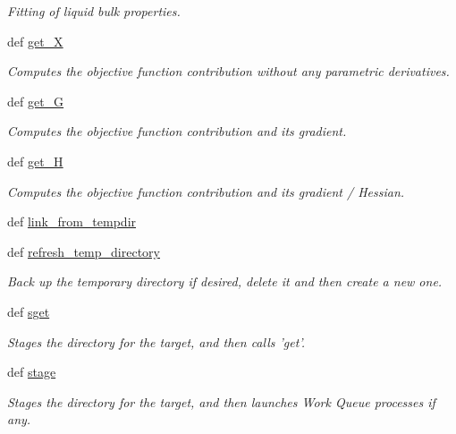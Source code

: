 \begin{DoxyCompactItemize}
\begin{DoxyCompactList}\small\item\em \-Fitting of liquid bulk properties. \end{DoxyCompactList}\item 
def \hyperlink{classforcebalance_1_1target_1_1Target_a606dd136f195c267c05a2455405e5949}{get\-\_\-\-X}
\begin{DoxyCompactList}\small\item\em \-Computes the objective function contribution without any parametric derivatives. \end{DoxyCompactList}\item 
def \hyperlink{classforcebalance_1_1target_1_1Target_afa8cc38c8bba8861c072e789717aa049}{get\-\_\-\-G}
\begin{DoxyCompactList}\small\item\em \-Computes the objective function contribution and its gradient. \end{DoxyCompactList}\item 
def \hyperlink{classforcebalance_1_1target_1_1Target_a1d2ee27fe86a09769c1816af23b09adb}{get\-\_\-\-H}
\begin{DoxyCompactList}\small\item\em \-Computes the objective function contribution and its gradient / \-Hessian. \end{DoxyCompactList}\item 
def \hyperlink{classforcebalance_1_1target_1_1Target_a5aa4958cea0a48138511567a076c5a82}{link\-\_\-from\-\_\-tempdir}
\item 
def \hyperlink{classforcebalance_1_1target_1_1Target_afe815eafab06ac92f10bbf4b88ad95c8}{refresh\-\_\-temp\-\_\-directory}
\begin{DoxyCompactList}\small\item\em \-Back up the temporary directory if desired, delete it and then create a new one. \end{DoxyCompactList}\item 
def \hyperlink{classforcebalance_1_1target_1_1Target_a51d58b55242bf4d4909c1837174f5f3c}{sget}
\begin{DoxyCompactList}\small\item\em \-Stages the directory for the target, and then calls 'get'. \end{DoxyCompactList}\item 
def \hyperlink{classforcebalance_1_1target_1_1Target_af8d2a4658c87841e40296795aec478bb}{stage}
\begin{DoxyCompactList}\small\item\em \-Stages the directory for the target, and then launches \-Work \-Queue processes if any. \end{DoxyCompactList}\item 

\end{DoxyCompactItemize}
